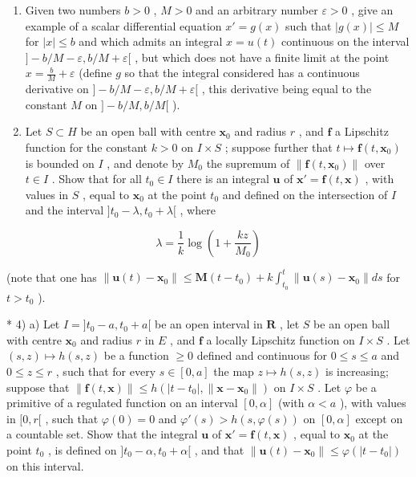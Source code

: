 \begin{enumerate}
\def\labelenumi{\arabic{enumi})}
\setcounter{enumi}{1}
\item
  Given two numbers \(b > 0\) , \(M > 0\) and an arbitrary number \(\varepsilon > 0\) , give an example of a scalar differential equation \(x' = g(x)\) such that \(|g(x)| \leqslant M\) for \(|x| \leqslant b\) and which admits an integral \(x = u(t)\) continuous on the interval \(] - b/M - \varepsilon, b/M + \varepsilon[\) , but which does not have a finite limit at the point \(x = \frac{b}{M} + \varepsilon\) (define \(g\) so that the integral considered has a continuous derivative on \(] - b/M - \varepsilon, b/M + \varepsilon[\) , this derivative being equal to the constant \(M\) on \(] - b/M, b/M[\) ).
\item
  Let \(S \subset H\) be an open ball with centre \(\mathbf{x}_0\) and radius \(r\) , and \(\mathbf{f}\) a Lipschitz function for the constant \(k > 0\) on \(I \times S\) ; suppose further that \(t \mapsto \mathbf{f}(t, \mathbf{x}_0)\) is bounded on \(I\) , and denote by \(M_0\) the supremum of \(\| \mathbf{f}(t, \mathbf{x}_0) \|\) over \(t \in I\) . Show that for all \(t_0 \in I\) there is an integral \(\mathbf{u}\) of \(\mathbf{x}' = \mathbf{f}(t, \mathbf{x})\) , with values in \(S\) , equal to \(\mathbf{x}_0\) at the point \(t_0\) and defined on the intersection of \(I\) and the interval \(]t_0 - \lambda, t_0 + \lambda[\) , where
\end{enumerate}

\[
\lambda = \frac {1}{k} \log \left(1 + \frac {k z}{M _ {0}}\right)
\]

(note that one has \(\| \mathbf{u}(t) - \mathbf{x}_0\| \leqslant \mathbf{M}(t - t_0) + k\int_{t_0}^t\| \mathbf{u}(s) - \mathbf{x}_0\| ds\) for \(t > t_0\) ).

* 4) a) Let \(I = ]t_0 - a, t_0 + a[\) be an open interval in \(\mathbf{R}\) , let \(S\) be an open ball with centre \(\mathbf{x}_0\) and radius \(r\) in \(E\) , and \(\mathbf{f}\) a locally Lipschitz function on \(I \times S\) . Let \((s, z) \mapsto h(s, z)\) be a function \(\geqslant 0\) defined and continuous for \(0 \leqslant s \leqslant a\) and \(0 \leqslant z \leqslant r\) , such that for every \(s \in [0, a]\) the map \(z \mapsto h(s, z)\) is increasing; suppose that \(\| \mathbf{f}(t, \mathbf{x}) \| \leqslant h(|t - t_0|, \| \mathbf{x} - \mathbf{x}_0 \|)\) on \(I \times S\) . Let \(\varphi\) be a primitive of a regulated function on an interval \([0, \alpha]\) (with \(\alpha < a\) ), with values in \([0, r[\) , such that \(\varphi(0) = 0\) and \(\varphi'(s) > h(s, \varphi(s))\) on \([0, \alpha]\) except on a countable set. Show that the integral \(\mathbf{u}\) of \(\mathbf{x}' = \mathbf{f}(t, \mathbf{x})\) , equal to \(\mathbf{x}_0\) at the point \(t_0\) , is defined on \(]t_0 - \alpha, t_0 + \alpha[\) , and that \(\| \mathbf{u}(t) - \mathbf{x}_0 \| \leqslant \varphi(|t - t_0|)\) on this interval.

